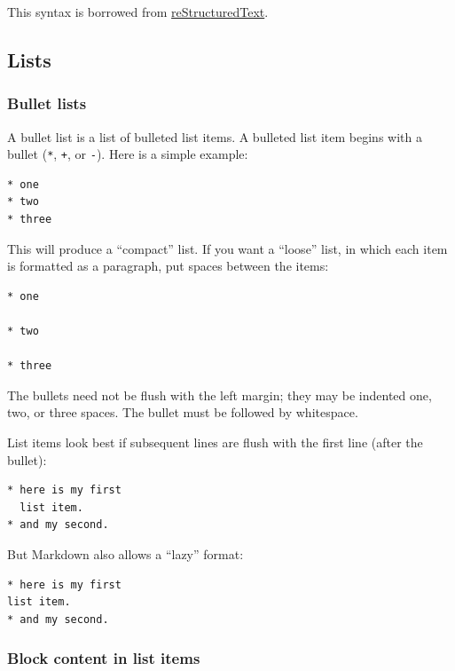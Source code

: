 \documentclass[
]{article}
\begin{document}
This syntax is borrowed from
\href{https://docutils.sourceforge.io/docs/ref/rst/introduction.html}{reStructuredText}.

\hypertarget{lists}{%
\subsection{Lists}\label{lists}}

\hypertarget{bullet-lists}{%
\subsubsection{Bullet lists}\label{bullet-lists}}

A bullet list is a list of bulleted list items. A bulleted list item
begins with a bullet (\texttt{*}, \texttt{+}, or \texttt{-}). Here is a
simple example:

\begin{verbatim}
* one
* two
* three
\end{verbatim}

This will produce a ``compact'' list. If you want a ``loose'' list, in
which each item is formatted as a paragraph, put spaces between the
items:

\begin{verbatim}
* one

* two

* three
\end{verbatim}

The bullets need not be flush with the left margin; they may be indented
one, two, or three spaces. The bullet must be followed by whitespace.

List items look best if subsequent lines are flush with the first line
(after the bullet):

\begin{verbatim}
* here is my first
  list item.
* and my second.
\end{verbatim}

But Markdown also allows a ``lazy'' format:

\begin{verbatim}
* here is my first
list item.
* and my second.
\end{verbatim}

\hypertarget{block-content-in-list-items}{%
\subsubsection{Block content in list
items}\label{block-content-in-list-items}}
\end{document}

